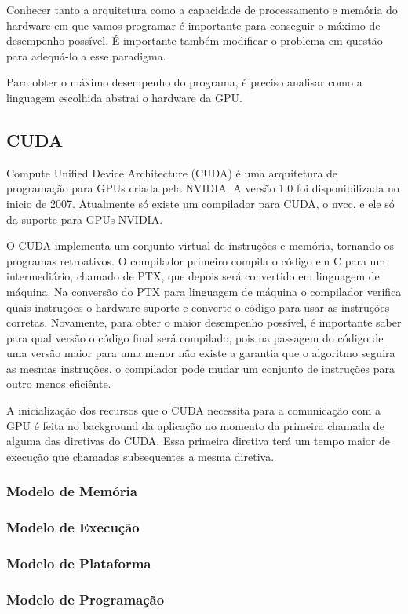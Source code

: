 Conhecer tanto a arquitetura como a capacidade de processamento e memória do hardware em que vamos programar é 
importante para conseguir o máximo de desempenho possível. É importante também modificar o problema em questão 
para adequá-lo a esse paradigma.

Para obter o máximo desempenho do programa, é preciso analisar como a linguagem escolhida abstrai o hardware da GPU.

\subsection{CUDA}
Compute Unified Device Architecture (CUDA) é uma arquitetura de programação para GPUs criada pela NVIDIA.
A versão 1.0 foi disponibilizada no inicio de 2007. Atualmente só existe um compilador para CUDA, o nvcc,
e ele só da suporte para GPUs NVIDIA.

O CUDA implementa um conjunto virtual de instruções e memória, tornando os programas retroativos. O compilador
primeiro compila o código em C para um intermediário, chamado de PTX, que depois será convertido em linguagem
de máquina. Na conversão do PTX para linguagem de máquina o compilador verifica quais instruções o hardware
suporte e converte o código para usar as instruções corretas. Novamente, para obter o maior desempenho possível,
é importante saber para qual versão o código final será compilado, pois na passagem do código de uma versão
maior para uma menor não existe a garantia que o algoritmo seguira as mesmas instruções, o compilador pode
mudar um conjunto de instruções para outro menos eficiênte.

A inicialização dos recursos que o CUDA necessita para a comunicação com a GPU é feita no background da
aplicação no momento da primeira chamada de alguma das diretivas do CUDA. Essa primeira diretiva terá um
tempo maior de execução que chamadas subsequentes a mesma diretiva.
\subsubsection{Modelo de Memória}

\subsubsection{Modelo de Execução}
\subsubsection{Modelo de Plataforma}
\subsubsection{Modelo de Programação}
